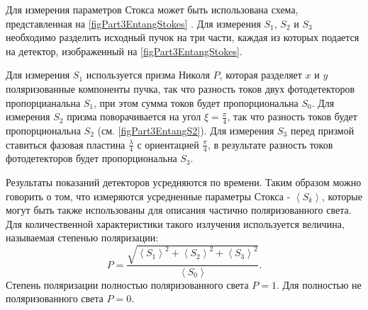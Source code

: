 

Для измерения параметров Стокса может быть использована схема,
представленная на \autoref{figPart3EntangStokes}
\cite{bEntangKlyshko}. Для измерения $S_1$, $S_2$ и $S_3$ необходимо
разделить исходный пучок на три части, каждая из которых подается на
детектор, изображенный на \autoref{figPart3EntangStokes}.



Для измерения $S_1$ используется призма Николя $P$, которая разделяет 
$x$ и $y$ поляризованные компоненты пучка,
так что разность токов двух фотодетекторов пропорцианальна $S_1$, при
этом сумма токов будет пропорциональна $S_0$. 
Для измерения $S_2$ призма поворачивается на угол $\xi =
\frac{\pi}{4}$, так что разность токов будет пропорциональна $S_2$
(см. \autoref{figPart3EntangS2}). 
Для измерения $S_3$ перед призмой ставиться фазовая пластина
$\frac{\lambda}{4}$ с ориентацией $\frac{\pi}{4}$, в результате
разность токов фотодетекторов будет пропорциональна $S_3$.

Результаты показаний детекторов усредняются по времени. Таким образом можно
говорить о том, что измеряются усредненные параметры Стокса - 
$\left<S_k\right>$, которые могут быть также использованы для описания
частично поляризованного света. Для количественной характеристики
такого излучения используется величина, называемая
степенью поляризации:
\begin{equation}
P = \frac{\sqrt{\left<S_1\right>^2 + \left<S_2\right>^2 +
    \left<S_3\right>^2}}{\left<S_0\right>}.
\label{eqEntangPolyarDegree}
\nonumber
\end{equation}
Степень поляризации полностью поляризованного света $P = 1$. Для  полностью не
поляризованного света $P = 0$.
